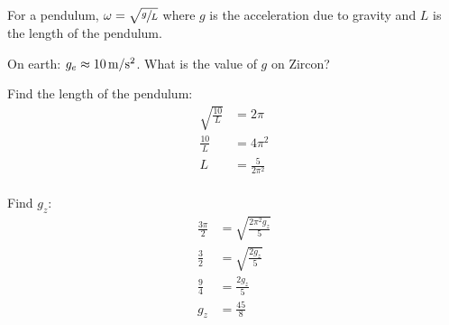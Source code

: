 \documentclass[fleqn,addpoints]{exam}
\begin{document}
\begin{questions}
\begin{parts}
        \bonuspart[4]
          For a pendulum, $\omega = \sqrt{ \sfrac{g}{L}}$ where $g$ is the acceleration due to gravity and
          $L$ is the length of the pendulum.

          On earth: $g_e \approx \unit[10]{m/s^2}$.  What is the value of $g$ on Zircon?

          \begin{solution}
            Find the length of the pendulum:
            \begin{align*}
              \sqrt{ \frac{10}{L} } & = 2 \pi \\
              \frac{10}{L}          & = 4 \pi^2 \\
              L                     & = \frac{5}{2 \pi^2} \\
            \end{align*}

            Find $g_z$:
            \begin{align*}
              \frac{3 \pi}{2} & = \sqrt{ \frac{2 \pi^2 g_z}{5}} \\
              \frac{3}{2}     & = \sqrt{ \frac{2 g_z}{5}} \\
              \frac{9}{4}     & = \frac{2 g_z}{5} \\
              g_z             & = \frac{45}{8} \\
            \end{align*}

          \end{solution}
      \end{parts}

  \end{questions}
\end{document}
